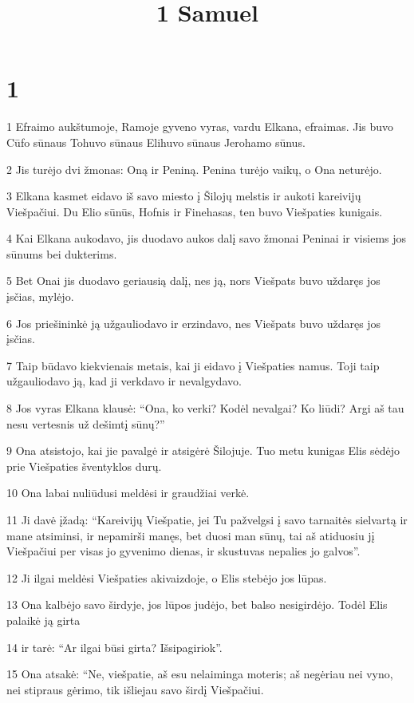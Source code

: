 

\title{
\par 1 Samuel}

\chapter{1}


\par 1 Efraimo aukštumoje, Ramoje gyveno vyras, vardu Elkana, efraimas. Jis buvo Cūfo sūnaus Tohuvo sūnaus Elihuvo sūnaus Jerohamo sūnus. 
\par 2 Jis turėjo dvi žmonas: Oną ir Peniną. Penina turėjo vaikų, o Ona neturėjo. 
\par 3 Elkana kasmet eidavo iš savo miesto į Šilojų melstis ir aukoti kareivijų Viešpačiui. Du Elio sūnūs, Hofnis ir Finehasas, ten buvo Viešpaties kunigais. 
\par 4 Kai Elkana aukodavo, jis duodavo aukos dalį savo žmonai Peninai ir visiems jos sūnums bei dukterims. 
\par 5 Bet Onai jis duodavo geriausią dalį, nes ją, nors Viešpats buvo uždaręs jos įsčias, mylėjo. 
\par 6 Jos priešininkė ją užgauliodavo ir erzindavo, nes Viešpats buvo uždaręs jos įsčias. 
\par 7 Taip būdavo kiekvienais metais, kai ji eidavo į Viešpaties namus. Toji taip užgauliodavo ją, kad ji verkdavo ir nevalgydavo. 
\par 8 Jos vyras Elkana klausė: “Ona, ko verki? Kodėl nevalgai? Ko liūdi? Argi aš tau nesu vertesnis už dešimtį sūnų?” 
\par 9 Ona atsistojo, kai jie pavalgė ir atsigėrė Šilojuje. Tuo metu kunigas Elis sėdėjo prie Viešpaties šventyklos durų. 
\par 10 Ona labai nuliūdusi meldėsi ir graudžiai verkė. 
\par 11 Ji davė įžadą: “Kareivijų Viešpatie, jei Tu pažvelgsi į savo tarnaitės sielvartą ir mane atsiminsi, ir nepamirši manęs, bet duosi man sūnų, tai aš atiduosiu jį Viešpačiui per visas jo gyvenimo dienas, ir skustuvas nepalies jo galvos”. 
\par 12 Ji ilgai meldėsi Viešpaties akivaizdoje, o Elis stebėjo jos lūpas. 
\par 13 Ona kalbėjo savo širdyje, jos lūpos judėjo, bet balso nesigirdėjo. Todėl Elis palaikė ją girta 
\par 14 ir tarė: “Ar ilgai būsi girta? Išsipagiriok”. 
\par 15 Ona atsakė: “Ne, viešpatie, aš esu nelaiminga moteris; aš negėriau nei vyno, nei stipraus gėrimo, tik išliejau savo širdį Viešpačiui. 
